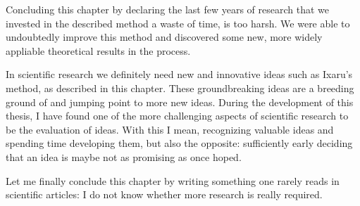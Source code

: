 Concluding this chapter by declaring the last few years of research that we invested in the described method a waste of time, is too harsh. We were able to undoubtedly improve this method and discovered some new, more widely appliable theoretical results in the process.

In scientific research we definitely need new and innovative ideas such as Ixaru's method, as described in this chapter. These groundbreaking ideas are a breeding ground of and jumping point to more new ideas. During the development of this thesis, I have found one of the more challenging aspects of scientific research to be the evaluation of ideas. With this I mean, recognizing valuable ideas and spending time developing them, but also the opposite: sufficiently early deciding that an idea is maybe not as promising as once hoped.

Let me finally conclude this chapter by writing something one rarely reads in scientific articles: I do not know whether more research is really required.

\stopchapter
